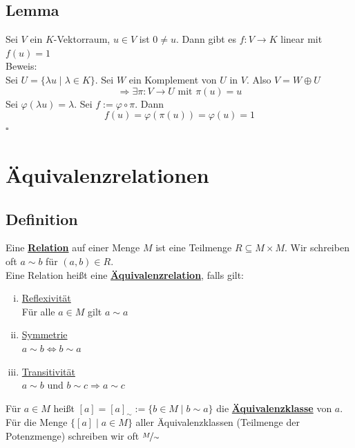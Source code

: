 \subsection{Lemma} %
\label{sub:lemma}
Sei $V$ ein \(K\)-Vektorraum, $u \in V$ ist $0  \not= u$. Dann gibt es $f: V \to K$ linear mit $f(u)=1$
\vspace{\baselineskip} \\
Beweis: \\
Sei $U= \{ \lambda u \mid \lambda \in K \}$. Sei $W$ ein Komplement von $U$ in $V$. Also $V= W \oplus U$
\[
	\Rightarrow \exists \pi : V \to U \text{ mit } \pi(u)=u
\]
Sei $\varphi(\lambda u) = \lambda $. Sei $f:= \varphi \circ \pi$. Dann
\[
	f(u)=\varphi ( \pi (u)) = \varphi (u) = 1
\]
\hfill  $\square$

\section{Äquivalenzrelationen} %
\label{sec:äquivalenzrelationen}

\subsection{Definition} %
\label{sub:definition}
Eine \underline{\textbf{Relation}} auf einer Menge $M$ ist eine Teilmenge $R \subseteq M \times M$. Wir schreiben oft $a \sim b$ für 
$(a,b) \in R$. \\
Eine Relation heißt eine \underline{\textbf{Äquivalenzrelation}}, falls gilt:
\begin{enumerate}[(i)]
	\item \underline{Reflexivität} \\
	Für alle $a \in M$ gilt $a \sim a$
	\item \underline{Symmetrie} \\
	$a \sim b \Leftrightarrow b \sim a$
	\item \underline{Transitivität} \\
	$a \sim b$ und $b \sim c \Rightarrow a \sim c$
\end{enumerate}
Für $a \in M$ heißt $[a]=[a]_\sim := \big\{ b \in M \mid b \sim a \big\}$ die 
\underline{\textbf{Äquivalenzklasse}} von $a$. \\
Für die Menge $ \{ [a] \mid a  \in M \}$ aller Äquivalenzklassen (Teilmenge der Potenzmenge) schreiben wir oft
$\nicefrac{M}{\sim}$

